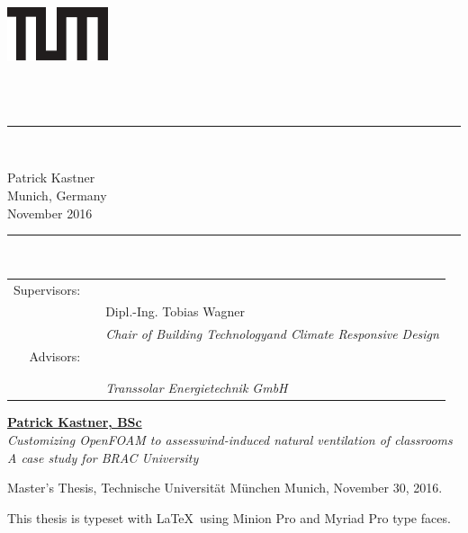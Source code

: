 \sffamily


\begin{titlepage}
	\begin{center}
		\includegraphics[width=.15\textwidth]{images/CP/tumlogo_blk}
	\end{center}
	\vspace{2ex}
	\begin{center}
		\large{\textsc{\art}}\\[4ex]
		\LARGE  {\textbf{\titel}}\\[2ex]
		\rule{0.1\textwidth}{.4pt}\\[1ex]
		\centering
		
		\Large
		Patrick Kastner\\[2ex]
		

	
		\large
		Munich, Germany\\
		November 2016\\[2ex]
		
		\rule{0.1\textwidth}{.4pt}\\[4ex]
		
		\large 
		\begin{tabular}{ r p{.05cm} p{7cm}  }
			Supervisors:  & &  \erstgutachter\\[0ex]
								& &  Dipl.-Ing. Tobias Wagner\\[1ex]
								& &  \textit{Chair of Building Technology\newline and Climate Responsive Design}\\[2ex]
			Advisors:		& & \zweitgutachter\\[0ex]
								& &  \drittgutachter\\[0ex]
								& & \viertgutachter\\[1ex]
								& &  \textit{Transsolar Energietechnik GmbH}
		\end{tabular}
	
			
	\end{center}
	
	\enlargethispage{3cm}
\end{titlepage}


\newpage
\clearpage
\thispagestyle{empty}
\rmfamily
\vspace*{\fill}
\href{mailto:patrick.kastner@tum.de}{\textbf{Patrick Kastner, BSc}}\\
\textit{Customizing OpenFOAM to assess\newline wind-induced natural ventilation of classrooms \newline A case study for BRAC University}

Master's Thesis,
Technische Universität München\newline
Munich, November 30, 2016.

This thesis is typeset with \LaTeX\ using Minion Pro and Myriad Pro type faces.